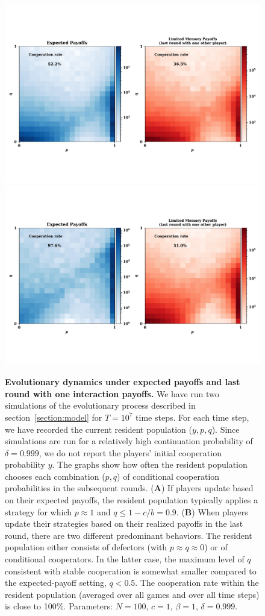 \documentclass[11pt]{article}
\theoremstyle{plainCl1}
\theoremstyle{plainCl2}
\begin{document}
\begin{figure}[!htbp]
    \centering
    \includegraphics[width=.75\textwidth]{static/expected_and_stochastic_for_donation_game.pdf}\vspace{-3cm}
    \includegraphics[width=.75\textwidth]{static/expected_and_stochastic_for_donation_game_b_10.pdf}
    \caption{{\bf Evolutionary dynamics under expected payoffs and last round with one interaction payoffs.} 
    We have run two simulations of the evolutionary process described in
    section~\ref{section:model} for $T\!=\!10^7$ time steps. For each time step,
    we have recorded the current resident population ($y,p,q$). Since simulations
    are run for a relatively high continuation probability of $\delta\!=\!0.999$, we
    do not report the players' initial cooperation probability $y$. The graphs show
    how often the resident population chooses each combination ($p,q$) of
    conditional cooperation probabilities in the subsequent rounds. ({\bf A}) If
    players update based on their expected payoffs, the resident population
    typically applies a strategy for which $p\!\approx\!1$ and
    $q\!\le\!1\!-\!c/b\!=\!0.9$. ({\bf B})
    When players update their strategies based on their realized payoffs in the last
    round, there are two different predominant behaviors. The resident population
    either consists of defectors (with $p\!\approx\!q\!\approx\!0$) or of
    conditional cooperators. In the latter case, the maximum level of $q$ consistent
    with stable cooperation is somewhat smaller compared to the expected-payoff
    setting, $q\!<\!0.5$. The cooperation rate within the resident population
    (averaged over all games and over all time steps) is close to 100\%. Parameters:
    $N\!=\!100$, $c\!=\!1$, $\beta\!=\!1$, $\delta\!=\!0.999$.}
    \label{fig:expected_and_stochastic_for_donation}
\end{figure}
\end{document}
